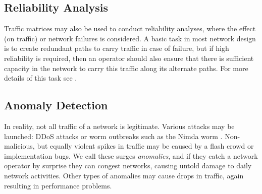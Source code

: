 

\subsection{Reliability Analysis}

Traffic matrices may also be used to conduct reliability analyses,
where the effect (on traffic) or network failures is considered. A
basic task in most network design is to create redundant paths to
carry traffic in case of failure, but if high reliability is required,
then an operator should also ensure that there is sufficient capacity
in the network to carry this traffic along its alternate paths.  For
more details of this task see \cite{Roughan10Robust}.

\subsection{Anomaly Detection}

In reality, not all traffic of a network is
legitimate. Various attacks may be launched: DDoS attacks \cite{Patrikakis04DDoS}
or worm outbreaks such as the Nimda worm \cite{Nimda}. Non-malicious, but equally
violent spikes in traffic may be caused by a flash crowd or
implementation bugs. We call these surges \textit{anomalies}, and if they catch
a network operator by surprise they can congest networks, causing
untold damage to daily network activities. Other types of anomalies
may cause drops in traffic, again resulting in performance problems.

